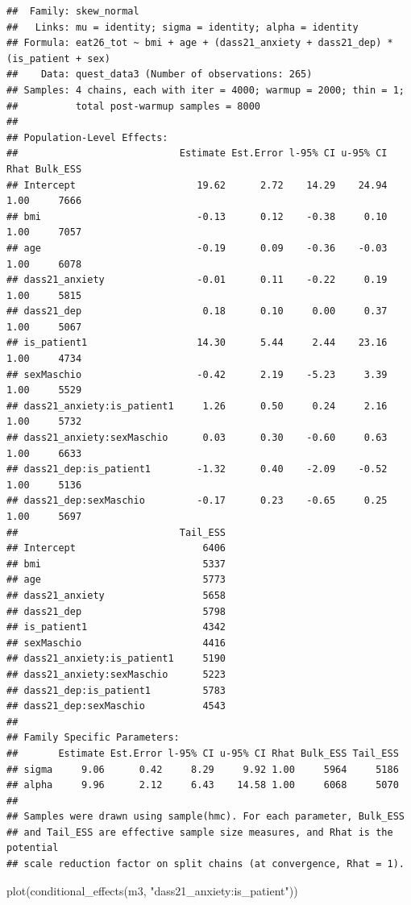 \documentclass[
]{article}
\newenvironment{Shaded}{\begin{snugshade}}{\end{snugshade}}
\newcommand{\FunctionTok}[1]{\textcolor[rgb]{0.00,0.00,0.00}{#1}}
\newcommand{\NormalTok}[1]{#1}
\newcommand{\StringTok}[1]{\textcolor[rgb]{0.31,0.60,0.02}{#1}}
\begin{document}
\begin{verbatim}
##  Family: skew_normal 
##   Links: mu = identity; sigma = identity; alpha = identity 
## Formula: eat26_tot ~ bmi + age + (dass21_anxiety + dass21_dep) * (is_patient + sex) 
##    Data: quest_data3 (Number of observations: 265) 
## Samples: 4 chains, each with iter = 4000; warmup = 2000; thin = 1;
##          total post-warmup samples = 8000
## 
## Population-Level Effects: 
##                            Estimate Est.Error l-95% CI u-95% CI Rhat Bulk_ESS
## Intercept                     19.62      2.72    14.29    24.94 1.00     7666
## bmi                           -0.13      0.12    -0.38     0.10 1.00     7057
## age                           -0.19      0.09    -0.36    -0.03 1.00     6078
## dass21_anxiety                -0.01      0.11    -0.22     0.19 1.00     5815
## dass21_dep                     0.18      0.10     0.00     0.37 1.00     5067
## is_patient1                   14.30      5.44     2.44    23.16 1.00     4734
## sexMaschio                    -0.42      2.19    -5.23     3.39 1.00     5529
## dass21_anxiety:is_patient1     1.26      0.50     0.24     2.16 1.00     5732
## dass21_anxiety:sexMaschio      0.03      0.30    -0.60     0.63 1.00     6633
## dass21_dep:is_patient1        -1.32      0.40    -2.09    -0.52 1.00     5136
## dass21_dep:sexMaschio         -0.17      0.23    -0.65     0.25 1.00     5697
##                            Tail_ESS
## Intercept                      6406
## bmi                            5337
## age                            5773
## dass21_anxiety                 5658
## dass21_dep                     5798
## is_patient1                    4342
## sexMaschio                     4416
## dass21_anxiety:is_patient1     5190
## dass21_anxiety:sexMaschio      5223
## dass21_dep:is_patient1         5783
## dass21_dep:sexMaschio          4543
## 
## Family Specific Parameters: 
##       Estimate Est.Error l-95% CI u-95% CI Rhat Bulk_ESS Tail_ESS
## sigma     9.06      0.42     8.29     9.92 1.00     5964     5186
## alpha     9.96      2.12     6.43    14.58 1.00     6068     5070
## 
## Samples were drawn using sample(hmc). For each parameter, Bulk_ESS
## and Tail_ESS are effective sample size measures, and Rhat is the potential
## scale reduction factor on split chains (at convergence, Rhat = 1).
\end{verbatim}

\begin{Shaded}
\begin{Highlighting}[]
\FunctionTok{plot}\NormalTok{(}\FunctionTok{conditional\_effects}\NormalTok{(m3, }\StringTok{"dass21\_anxiety:is\_patient"}\NormalTok{))}
\end{Highlighting}
\end{Shaded}
\end{document}
